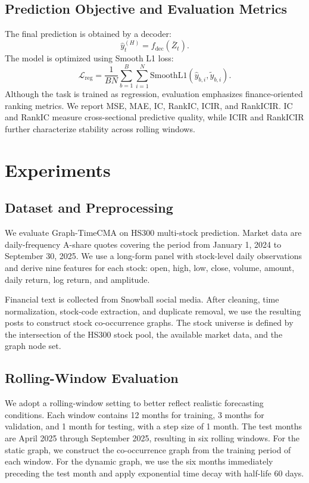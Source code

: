 \documentclass[11pt]{article}
\begin{document}
\subsection{Prediction Objective and Evaluation Metrics}

The final prediction is obtained by a decoder:
\begin{equation}
\hat{y}^{(H)}_t = f_{\text{dec}}(\bar{Z}_t).
\end{equation}
The model is optimized using Smooth L1 loss:
\begin{equation}
\mathcal{L}_{\text{reg}} = \frac{1}{BN} \sum_{b=1}^{B} \sum_{i=1}^{N} \text{SmoothL1}(\hat{y}_{b,i}, \tilde{y}_{b,i}).
\end{equation}
Although the task is trained as regression, evaluation emphasizes finance-oriented ranking metrics. We report MSE, MAE, IC, RankIC, ICIR, and RankICIR. IC and RankIC measure cross-sectional predictive quality, while ICIR and RankICIR further characterize stability across rolling windows.

\section{Experiments}

\subsection{Dataset and Preprocessing}

We evaluate Graph-TimeCMA on HS300 multi-stock prediction. Market data are daily-frequency A-share quotes covering the period from January 1, 2024 to September 30, 2025. We use a long-form panel with stock-level daily observations and derive nine features for each stock: open, high, low, close, volume, amount, daily return, log return, and amplitude.

Financial text is collected from Snowball social media. After cleaning, time normalization, stock-code extraction, and duplicate removal, we use the resulting posts to construct stock co-occurrence graphs. The stock universe is defined by the intersection of the HS300 stock pool, the available market data, and the graph node set.

\subsection{Rolling-Window Evaluation}

We adopt a rolling-window setting to better reflect realistic forecasting conditions. Each window contains 12 months for training, 3 months for validation, and 1 month for testing, with a step size of 1 month. The test months are April 2025 through September 2025, resulting in six rolling windows. For the static graph, we construct the co-occurrence graph from the training period of each window. For the dynamic graph, we use the six months immediately preceding the test month and apply exponential time decay with half-life 60 days.
\end{document}
